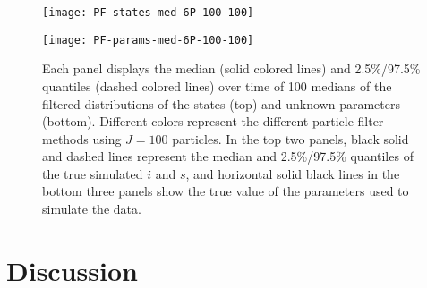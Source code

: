 \documentclass{article}
\begin{document}
\begin{figure}[ht]
\centering
\begin{minipage}{1.0\linewidth}
\texttt{[image: PF-states-med-6P-100-100]}
\end{minipage}
\begin{minipage}{1.1\linewidth}
\texttt{[image: PF-params-med-6P-100-100]}
\end{minipage}
\caption{Each panel displays the median (solid colored lines) and 2.5\%/97.5\% quantiles (dashed colored lines) over time of 100 medians of the filtered distributions of the states (top) and unknown parameters (bottom).  Different colors represent the different particle filter methods using $J = 100$ particles.  In the top two panels, black solid and dashed lines represent the median and 2.5\%/97.5\% quantiles of the true simulated $i$ and $s$, and horizontal solid black lines in the bottom three panels show the true value of the parameters used to simulate the data.} \label{fig:meds}
\end{figure}

\section{Discussion \label{sec:discussion}}



\end{document}
